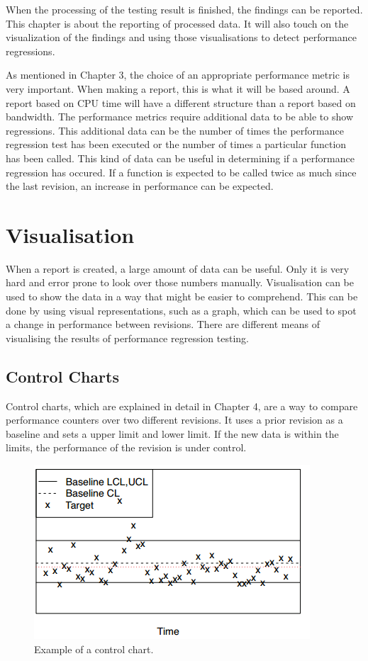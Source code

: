When the processing of the testing result is finished, the findings can be reported. This chapter is about the reporting of processed data. It will also touch on the visualization of the findings and using those visualisations to detect performance regressions.

As mentioned in Chapter 3, the choice of an appropriate performance metric is very important. When making a report, this is what it will be based around. A report based on CPU time will have a different structure than a report based on bandwidth. The performance metrics require additional data to be able to show regressions. This additional data can be the number of times the performance regression test has been executed or the number of times a particular function has been called. This kind of data can be useful in determining if a performance regression has occured. If a function is expected to be called twice as much since the last revision, an increase in performance can be expected.

\section{Visualisation}
When a report is created, a large amount of data can be useful. Only it is very hard and error prone to look over those numbers manually. Visualisation can be used to show the data in a way that might be easier to comprehend. This can be done by using visual representations, such as a graph, which can be used to spot a change in performance between revisions. There are different means of visualising the results of performance regression testing.

\subsection{Control Charts}
Control charts, which are explained in detail in Chapter 4, are a way to compare performance counters over two different revisions. It uses a prior revision as a baseline and sets a upper limit and lower limit. If the new data is within the limits, the performance of the revision is under control.
\begin{figure}[h]
\begin{center}
  \includegraphics[scale=0.7]{Figures/controlchart.png}
\end{center}
  \caption{Example of a control chart\cite{nguyen2012using}.}
  \label{figure:control_chart}

\end{figure}


